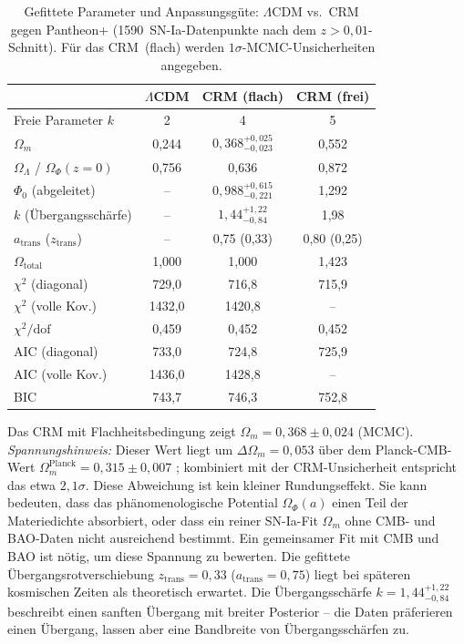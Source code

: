 \documentclass[aps,prd,twocolumn,superscriptaddress,nofootinbib]{revtex4-2}
\begin{document}
\begin{table}[H]
\centering
\caption{Gefittete Parameter und Anpassungsgüte: $\Lambda$CDM vs.\ CRM gegen Pantheon+ (1590~SN-Ia-Datenpunkte nach dem $z>0{,}01$-Schnitt). Für das CRM~(flach) werden $1\sigma$-MCMC-Unsicherheiten angegeben.}
\label{tab:results}
\begin{tabular}{lccc}
\toprule
 & $\Lambda$CDM & CRM (flach) & CRM (frei) \\
\midrule
Freie Parameter $k$ & 2 & 4 & 5 \\
$\Omega_m$ & 0,244 & $0{,}368^{+0{,}025}_{-0{,}023}$ & 0,552 \\
$\Omega_\Lambda$ / $\Omega_\Phi(z{=}0)$ & 0,756 & 0,636 & 0,872 \\
$\Phi_0$ (abgeleitet) & -- & $0{,}988^{+0{,}615}_{-0{,}221}$ & 1,292 \\
$k$ (\"Ubergangssch\"arfe) & -- & $1{,}44^{+1{,}22}_{-0{,}84}$ & 1,98 \\
$a_{\mathrm{trans}}$ ($z_{\mathrm{trans}}$) & -- & 0,75 (0,33) & 0,80 (0,25) \\
$\Omega_{\mathrm{total}}$ & 1,000 & 1,000 & 1,423 \\
\midrule
$\chi^2$ (diagonal) & 729,0 & 716,8 & 715,9 \\
$\chi^2$ (volle Kov.) & 1432,0 & 1420,8 & -- \\
$\chi^2/\mathrm{dof}$ & 0,459 & 0,452 & 0,452 \\
AIC (diagonal) & 733,0 & 724,8 & 725,9 \\
AIC (volle Kov.) & 1436,0 & 1428,8 & -- \\
BIC & 743,7 & 746,3 & 752,8 \\
\bottomrule
\end{tabular}
\end{table}

Das CRM mit Flachheitsbedingung zeigt $\Omega_m = 0{,}368 \pm 0{,}024$ (MCMC). \textit{Spannungshinweis:} Dieser Wert liegt um $\Delta\Omega_m = 0{,}053$ über dem Planck-CMB-Wert $\Omega_m^{\mathrm{Planck}} = 0{,}315 \pm 0{,}007$ \cite{Planck2020}; kombiniert mit der CRM-Unsicherheit entspricht das etwa $2{,}1\sigma$. Diese Abweichung ist kein kleiner Rundungseffekt. Sie kann bedeuten, dass das phänomenologische Potential $\Omega_\Phi(a)$ einen Teil der Materiedichte absorbiert, oder dass ein reiner SN-Ia-Fit $\Omega_m$ ohne CMB- und BAO-Daten nicht ausreichend bestimmt. Ein gemeinsamer Fit mit CMB und BAO ist nötig, um diese Spannung zu bewerten. Die gefittete Übergangsrotverschiebung $z_{\mathrm{trans}} = 0{,}33$ ($a_{\mathrm{trans}} = 0{,}75$) liegt bei späteren kosmischen Zeiten als theoretisch erwartet. Die Übergangsschärfe $k = 1{,}44^{+1{,}22}_{-0{,}84}$ beschreibt einen sanften Übergang mit breiter Posterior -- die Daten präferieren einen Übergang, lassen aber eine Bandbreite von Übergangsschärfen zu.
\end{document}
